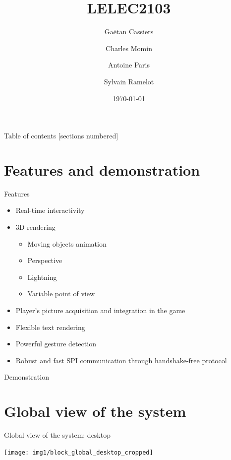 \documentclass[10pt]{beamer}
\title{LELEC2103}
\subtitle{}
\date{\today}
\author{Gaëtan Cassiers\and Charles Momin \and Antoine Paris \and Sylvain Ramelot}
\institute{Ecole polytechnique de Louvain}
\begin{document}
\maketitle
{}

\begin{frame}{Table of contents}
  [sections numbered]
  \tableofcontents%
\end{frame}


\section{Features and demonstration}
\begin{frame}{Features}
    \begin{itemize}
        \item Real-time interactivity
        \item 3D rendering
        \begin{itemize}
            \item Moving objects animation
            \item Perspective
            \item Lightning
            \item Variable point of view
        \end{itemize}
        \item Player's picture acquisition and integration in the game
        \item Flexible text rendering
        \item Powerful gesture detection
        \item Robust and fast SPI communication through handshake-free protocol
    \end{itemize}
\end{frame}

\begin{frame}{Demonstration}
\end{frame}

\section{Global view of the system}
\begin{frame}{Global view of the system: desktop}
    \begin{center}
        \texttt{[image: img1/block\_global\_desktop\_cropped]}
    \end{center}
\end{frame}
\end{document}
